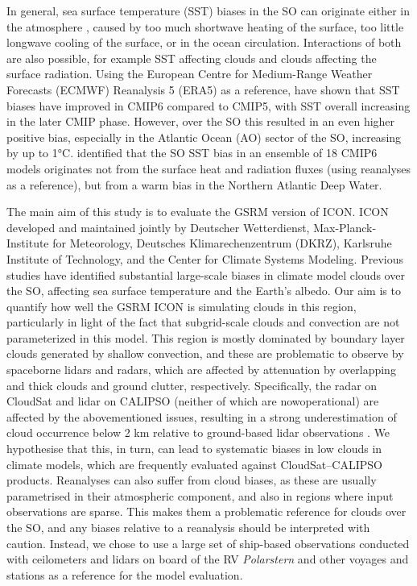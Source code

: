 \documentclass[12pt,a4paper]{article}
\begin{document}
In general, sea surface temperature (SST) biases in the SO can originate either
in the atmosphere \citep{hyder2018}, caused by too much shortwave heating of the surface, too
little longwave cooling of the surface, or in the ocean circulation.
Interactions of both are also possible, for example SST affecting clouds and
clouds affecting the surface radiation. Using the European
Centre for Medium-Range Weather Forecasts (ECMWF) Reanalysis 5 (ERA5) as a reference, \cite{zhang2023} have shown that SST
biases have improved in CMIP6 compared to CMIP5, with SST
overall increasing in the later CMIP phase. However, over the SO this resulted
in an even higher positive bias, especially in the Atlantic Ocean (AO) sector
of the SO, increasing by up to 1°C.  \cite{luo2023} identified that the SO SST
bias in an ensemble of 18 CMIP6 models originates not from the surface heat and
radiation fluxes (using reanalyses as a reference), but from a warm bias in the
Northern Atlantic Deep Water.

The main aim of this study is to evaluate the GSRM version of ICON. ICON developed and maintained
jointly by Deutscher Wetterdienst, Max-Planck-Institute for
Meteorology, Deutsches Klimarechenzentrum (DKRZ), Karlsruhe Institute of
Technology, and the Center for Climate Systems Modeling.  Previous studies have
identified substantial large-scale biases in climate model clouds over the SO,
affecting sea surface temperature and the Earth’s albedo. Our aim is to
quantify how well the GSRM ICON is simulating clouds in this region,
particularly in light of the fact that subgrid-scale clouds and convection are
not parameterized in this model. This region is mostly dominated by boundary
layer clouds generated by shallow convection, and these are problematic to
observe by spaceborne lidars and radars, which are affected by attenuation by
overlapping and thick clouds and ground clutter, respectively.  Specifically,
the radar on CloudSat and lidar on CALIPSO (neither of which are nowoperational) are affected by the abovementioned issues, resulting in a strong
underestimation of cloud occurrence below 2 km relative to ground-based lidar
observations \citep{mcerlich2021}.  We hypothesise that this, in turn, can lead to systematic
biases in low clouds in climate models, which are frequently evaluated against
CloudSat--CALIPSO products. Reanalyses can also suffer from cloud biases, as
these are usually parametrised in their atmospheric component, and also in
regions where input observations are sparse.  This makes them a problematic
reference for clouds over the SO, and any biases relative to a reanalysis
should be interpreted with caution. Instead, we chose to use a large set of
ship-based observations conducted with ceilometers and lidars on board of the
RV \emph{Polarstern} and other voyages and stations as a reference for the
model evaluation.
\end{document}
